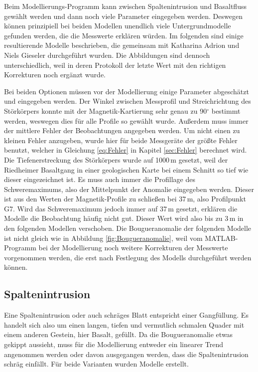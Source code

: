 Beim Modellierungs-Programm kann zwischen Spaltenintrusion und Basaltfluss gewählt werden und dann noch viele Parameter eingegeben werden. Deswegen können prinzipiell bei beiden Modellen unendlich viele Untergrundmodelle gefunden werden, die die Messwerte erklären würden. Im folgenden sind einige resultierende Modelle beschrieben, die gemeinsam mit Katharina Adrion und Niels Gieseler durchgeführt wurden. Die Abbildungen sind dennoch unterschiedlich, weil in deren Protokoll der letzte Wert mit den richtigen Korrekturen noch ergänzt wurde.

Bei beiden Optionen müssen vor der Modellierung einige Parameter abgeschätzt und eingegeben werden. Der Winkel zwischen Messprofil und Streichrichtung des Störkörpers konnte mit der Magnetik-Kartierung sehr genau zu 90$^\circ$ bestimmt werden, weswegen dies für alle Profile so gewählt wurde. Außerdem muss immer der mittlere Fehler der Beobachtungen angegeben werden. Um nicht einen zu kleinen Fehler anzugeben, wurde hier für beide Messgeräte der größte Fehler benutzt, welcher in Gleichung \eqref{eq:Fehler} in Kapitel \ref{sec:Fehler} berechnet wird. Die Tiefenerstreckung des Störkörpers wurde auf 1000\,m gesetzt, weil der Riedheimer Basaltgang in einer geologischen Karte bei einem Schnitt so tief wie dieser eingezeichnet ist. Es muss auch immer die Profillage des Schweremaximums, also der Mittelpunkt der Anomalie eingegeben werden. Dieser ist aus den Werten der Magnetik-Profile zu schließen bei 37\,m, also Profilpunkt G7. 
Wird das Schweremaximum jedoch immer auf 37\,m gesetzt, erklären die Modelle die Beobachtung häufig nicht gut. Dieser Wert wird also bis zu 3\,m in den folgenden Modellen verschoben.
Die Bougueranomalie der folgenden Modelle ist nicht gleich wie in Abbildung \ref{fig:Bougueranomalie}, weil vom MATLAB-Programm bei der Modellierung noch weitere Korrekturen der Messwerte vorgenommen werden, die erst nach Festlegung des Modells durchgeführt werden können.

\subsection{Spaltenintrusion}

Eine Spaltenintrusion oder auch schräges Blatt entspricht einer Gangfüllung. Es handelt sich also um einen langen, tiefen und vermutlich schmalen Quader mit einem anderen Gestein, hier Basalt, gefüllt.
Da die Bougueranomalie etwas gekippt aussieht, muss für die Modellierung entweder ein linearer Trend angenommen werden oder davon ausgegangen werden, dass die Spaltenintrusion schräg einfällt. Für beide Varianten wurden Modelle erstellt.

